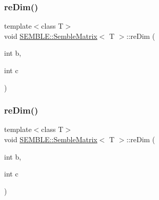 \subsubsection{\texorpdfstring{reDim()}{reDim()}\hspace{0.1cm}{\footnotesize\ttfamily [1/4]}}
{\footnotesize\ttfamily template$<$class T$>$ \\
void \mbox{\hyperlink{structSEMBLE_1_1SembleMatrix}{S\+E\+M\+B\+L\+E\+::\+Semble\+Matrix}}$<$ T $>$\+::re\+Dim (\begin{DoxyParamCaption}\item[{int}]{b,  }\item[{int}]{c }\end{DoxyParamCaption})\hspace{0.3cm}{\ttfamily [inline]}}

\mbox{\label{structSEMBLE_1_1SembleMatrix_a376b3b7cc061b6d20370cb78ade11b0e}} 
\subsubsection{\texorpdfstring{reDim()}{reDim()}\hspace{0.1cm}{\footnotesize\ttfamily [2/4]}}
{\footnotesize\ttfamily template$<$class T$>$ \\
void \mbox{\hyperlink{structSEMBLE_1_1SembleMatrix}{S\+E\+M\+B\+L\+E\+::\+Semble\+Matrix}}$<$ T $>$\+::re\+Dim (\begin{DoxyParamCaption}\item[{int}]{b,  }\item[{int}]{c }\end{DoxyParamCaption})\hspace{0.3cm}{\ttfamily [inline]}}


